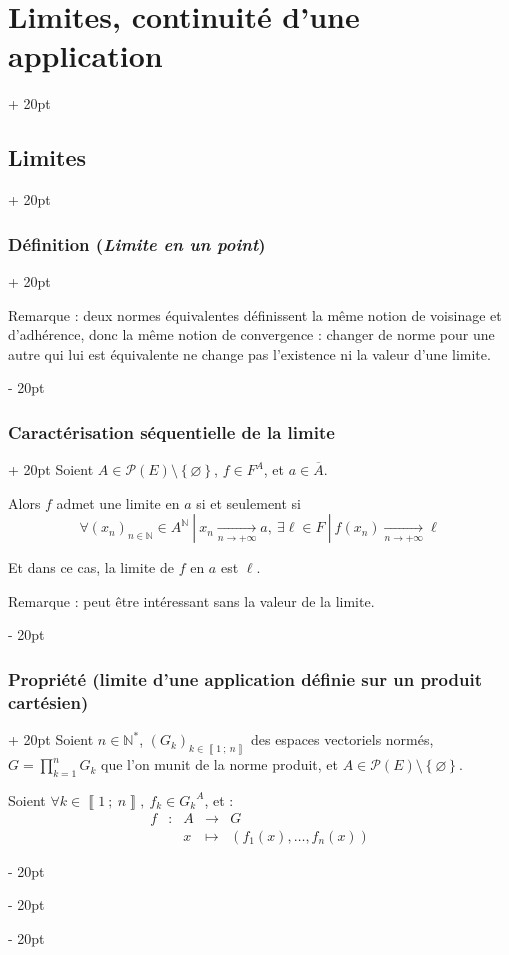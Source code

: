\documentclass[a4paper, 12pt, twoside]{article}
\newcommand{\N}{\mathbb{N}} %
\newcommand{\nset}[2]{\left\llbracket #1\ ;\ #2 \right\rrbracket}
\newcommand{\cj}[1]{\overline{#1}} %
\newcommand{\tendsto}[1]{\xrightarrow[#1]{}}
\newcommand{\lr}[1]{\left( #1 \right)}
\newcommand{\set}[1]{\left\{ #1 \right\}}
\newcommand{\ind}[1][20pt]{\advance\leftskip + #1}
\newcommand{\deind}[1][20pt]{\advance\leftskip - #1}
\newenvironment{indt}[2][20pt]{#2 \par \ind[#1]}{\par \deind} %
\begin{document}
\begin{indt}{\section{Limites, continuité d'une application}}
\begin{indt}{\subsection{Limites}}
\begin{indt}{\subsubsection{Définition (\textit{Limite en un point})}}
                \vspace{12pt}
                
                Remarque : deux normes équivalentes définissent la même notion de voisinage et d'adhérence, donc la même notion de convergence : changer de norme pour une autre qui lui est équivalente ne change pas l'existence ni la valeur d'une limite.
            \end{indt}

            \vspace{12pt}
            
            \begin{indt}{\subsubsection{Caractérisation séquentielle de la limite}}
                Soient $A \in \mathcal P(E) \setminus \set \varnothing$, $f \in F^A$, et $a \in \cj A$.

                Alors $f$ admet une limite en $a$ si et seulement si
                \[
                    \forall (x_n)_{n \in \N} \in A^\N\ |\ x_n \tendsto{n \to +\infty} a,\
                    \exists \ell \in F\ |\ f(x_n) \tendsto{n \to +\infty} \ell
                \]

                Et dans ce cas, la limite de $f$ en $a$ est $\ell$.

                \vspace{12pt}
                
                Remarque : peut être intéressant sans la valeur de la limite.
            \end{indt}

            \vspace{12pt}
            
            \begin{indt}{\subsubsection{Propriété (limite d'une application définie sur un produit cartésien)}}
                Soient $n \in \N^*$, $(G_k)_{k \in \nset 1 n}$ des espaces vectoriels normés, $\displaystyle G = \prod_{k = 1}^n G_k$ que l'on munit de la norme produit, et $A \in \mathcal P(E) \setminus \set \varnothing$.

                Soient $\forall k \in \nset 1 n,\ f_k \in {G_k}^A$, et :
                \[
                    \begin{array}{ccccc}
                        f & : & A & \longrightarrow & G
                        \\
                          && x & \longmapsto & \lr{f_1(x), \ldots, f_n(x)}
                    \end{array}
                \]


\end{indt}
\end{indt}
\end{indt}
\end{document}
